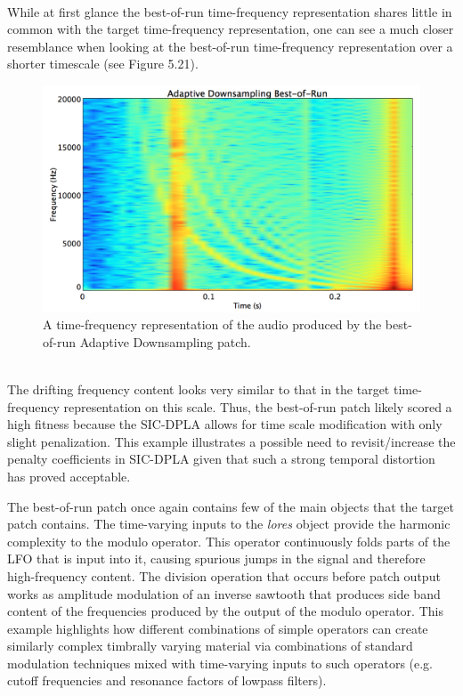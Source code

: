 \documentclass[a4paper,12pt]{report} 	%
\numberwithin{figure}{chapter}
\numberwithin{table}{chapter}
\numberwithin{equation}{chapter}
\begin{document}
\begin{flushleft}
\begin{figure}[h!]
\end{figure}
\\
While at first glance the best-of-run time-frequency representation shares little in common with the target time-frequency representation, one can see a much closer resemblance when looking at the best-of-run time-frequency representation over a shorter timescale (see Figure 5.21).
\begin{figure}[h!]
\begin{center}
\includegraphics[scale=0.35,width=\linewidth]{AdaptiveDownsamplingBestOfRunSTFT2}
\caption[Best-of-Run Adaptive Downsampling Time-Frequency Representation]{A time-frequency representation of the audio produced by the best-of-run Adaptive Downsampling patch.}
\end{center}
\end{figure}
\\
The drifting frequency content looks very similar to that in the target time-frequency representation on this scale. Thus, the best-of-run patch likely scored a high fitness because the SIC-DPLA allows for time scale modification with only slight penalization. This example illustrates a possible need to revisit/increase the penalty coefficients in SIC-DPLA given that such a strong temporal distortion has proved acceptable.

The best-of-run patch once again contains few of the main objects that the target patch contains. The time-varying inputs to the \emph{lores\texttildelow{}} object provide the harmonic complexity to the modulo operator. This operator continuously folds parts of the LFO that is input into it, causing spurious jumps in the signal and therefore high-frequency content. The division operation that occurs before patch output works as amplitude modulation of an inverse sawtooth that produces side band content of the frequencies produced by the output of the modulo operator. This example highlights how different combinations of simple operators can create similarly complex timbrally varying material via combinations of standard modulation techniques mixed with time-varying inputs to such operators (e.g. cutoff frequencies and resonance factors of lowpass filters). 


\end{flushleft}
\end{document}
